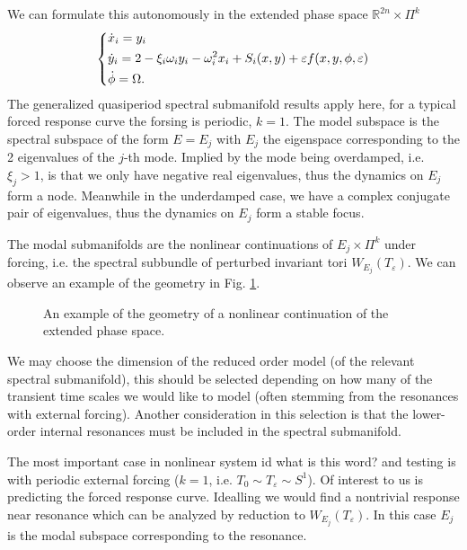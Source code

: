 We can formulate this autonomously in the extended phase space $\mathbb{R}^{2n}\times \Pi^{k}$ 
\begin{align}
	\begin{dcases}
		\dot{x}_i = y_i \\
		\dot{y}_i = 2- \xi_i \omega_i y_i - \omega_i^2 x_i + S_i(x,y) +\varepsilon f(x,y,\phi, \varepsilon)\\
		\dot{\phi} = \Omega.
	\end{dcases}
\end{align}
The generalized quasiperiod spectral submanifold results apply here, for a typical forced response curve the forsing is periodic, $k=1$. The model subspace is the spectral subspace of the form $E=E_j$ with $E_j$ the eigenspace corresponding to the 2 eigenvalues of the $j$-th mode. Implied by the mode being overdamped, i.e. $\xi_j>1$, is that we only have negative real eigenvalues, thus the dynamics on $E_j$ form a node. Meanwhile in the underdamped case, we have a complex conjugate pair of eigenvalues, thus the dynamics on $E_j$ form a stable focus.  

The modal submanifolds are the nonlinear continuations of $E_j \times \Pi^{k}$ under forcing, i.e. the spectral subbundle of perturbed invariant tori $W_{E_j}(T_{\varepsilon})$. We can observe an example of the geometry in Fig. \ref{fig:ssm_ex3}.

\begin{figure}[h!]
	\centering
	\caption{An example of the geometry of a nonlinear continuation of the extended phase space.}
	\label{fig:ssm_ex3}
\end{figure}

We may choose the dimension of the reduced order model (of the relevant spectral submanifold), this should be selected depending on how many of the transient time scales we would like to model (often stemming from the resonances with external forcing). Another consideration in this selection is that the lower-order internal resonances must be included in the spectral submanifold.

The most important case in nonlinear system id {\color{blue} what is this word?} and testing is with periodic external forcing ($k=1$, i.e. $T_0 \sim T_{\varepsilon} \sim S^1$). Of interest to us is predicting the forced response curve. Idealling we would find a nontrivial response near resonance which can be analyzed by reduction to $W_{E_j}(T_{\varepsilon})$. In this case $E_j$ is the modal subspace corresponding to the resonance.

